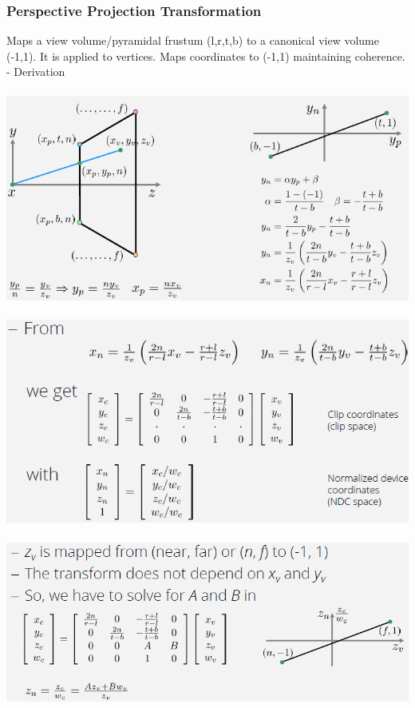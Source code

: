 \documentclass{article}
\begin{document}
\subsubsection{Perspective Projection Transformation}
Maps a view volume/pyramidal frustum (l,r,t,b) to a canonical view volume (-1,1). It is applied to vertices. Maps coordinates to (-1,1) maintaining coherence.\\

- Derivation \\\\
\includegraphics[scale=0.6]{image41.png}\\\\
\includegraphics[scale=0.6]{image42.png}\\\\
\includegraphics[scale=0.6]{image43.png}\\\\
\end{document}
